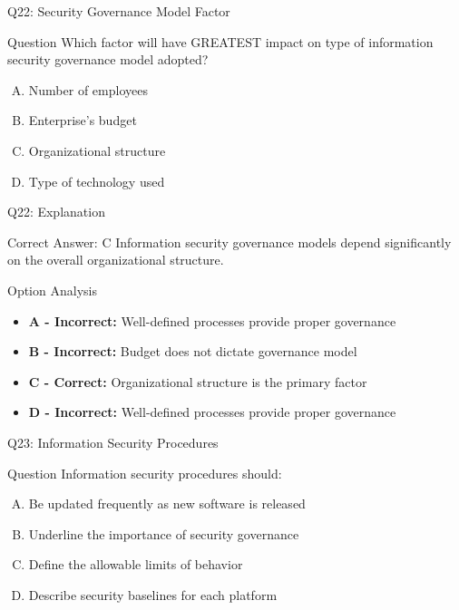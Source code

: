 \documentclass{beamer}
\begin{document}
	\begin{frame}{Q22: Security Governance Model Factor}
		\begin{block}{Question}
			Which factor will have GREATEST impact on type of information security governance model adopted?
		\end{block}
		\begin{enumerate}[(A)]
			\item Number of employees
			\item Enterprise's budget
			\item Organizational structure
			\item Type of technology used
		\end{enumerate}
	\end{frame}
	
	\begin{frame}{Q22: Explanation}
		\begin{block}{Correct Answer: C}
			Information security governance models depend significantly on the overall organizational structure.
		\end{block}
		\begin{block}{Option Analysis}
			\begin{itemize}
				\item \textbf{A - Incorrect:} Well-defined processes provide proper governance
				\item \textbf{B - Incorrect:} Budget does not dictate governance model
				\item \textbf{C - Correct:} Organizational structure is the primary factor
				\item \textbf{D - Incorrect:} Well-defined processes provide proper governance
			\end{itemize}
		\end{block}
	\end{frame}
	
	\begin{frame}{Q23: Information Security Procedures}
		\begin{block}{Question}
			Information security procedures should:
		\end{block}
		\begin{enumerate}[(A)]
			\item Be updated frequently as new software is released
			\item Underline the importance of security governance
			\item Define the allowable limits of behavior
			\item Describe security baselines for each platform
		\end{enumerate}
	\end{frame}
	
\end{document}
